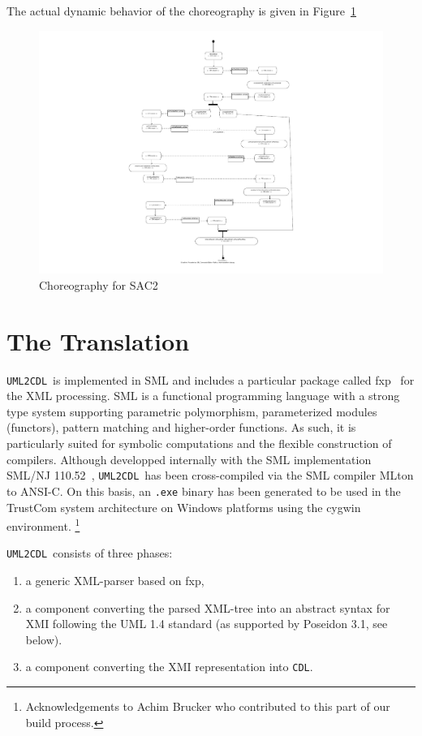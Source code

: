\documentclass[pdftex]{scrartcl}
\newcommand{\umlToCdl}{\texttt{UML2CDL}}
\newcommand{\cdl}{\texttt{CDL}}
\begin{document}
The actual dynamic behavior of the choreography is given in
Figure~\ref{fig:SAC2-chor-model} 

\begin{figure}
  \centering
  \includegraphics[trim=200 0 0 0]{SAC2-chor-model.pdf}
  \caption{Choreography for SAC2}
  \label{fig:SAC2-chor-model}
\end{figure}

\newpage

\section{The Translation}

\umlToCdl\ is implemented in SML and includes a particular package
called fxp~\cite{fxp} for the XML processing. SML is a functional
programming language with a strong type system supporting parametric
polymorphism, parameterized modules (functors), pattern matching and
higher-order functions. As such, it is particularly suited for
symbolic computations and the flexible construction of compilers.
Although developped internally with the SML implementation SML/NJ
110.52~\cite{njml}, \umlToCdl\ has been cross-compiled via the SML
compiler MLton\cite{mlton} to ANSI-C.  On this basis, an \texttt{.exe}
binary 
has been generated to be used in the TrustCom system architecture on
Windows platforms using the cygwin environment.
\footnote{Acknowledgements to Achim Brucker who contributed to this
  part of our build process.}

\umlToCdl\ consists of three phases:
\begin{enumerate}
\item a generic XML-parser based on fxp,
\item a component converting the parsed XML-tree into 
      an abstract syntax for XMI following the UML 1.4
      standard (as supported by Poseidon 3.1, see below).
\item a component converting the XMI representation into
      \cdl.
\end{enumerate}
\end{document}
